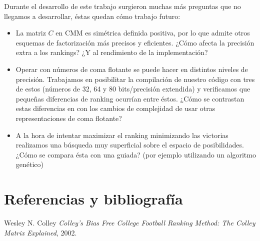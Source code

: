 \documentclass[a4paper]{article}
\begin{document}
Durante el desarrollo de este trabajo surgieron muchas más preguntas que no llegamos a desarrollar, éstas quedan cómo trabajo futuro:
\begin{itemize}
    \item La matriz $C$ en CMM es simétrica definida positiva, por lo que admite otros esquemas de factorización más precisos y eficientes. ¿Cómo afecta la precisión extra a los rankings? ¿Y al rendimiento de la implementación?
    \item Operar con números de coma flotante se puede hacer en distintos niveles de precisión. Trabajamos en posibilitar la compilación de nuestro código con tres de estos (números de 32, 64 y 80 bits/precisión extendida) y verificamos que pequeñas diferencias de ranking ocurrían entre éstos. ¿Cómo se contrastan estas diferencias en con los cambios de complejidad de usar otras representaciones de coma flotante?
    \item A la hora de intentar maximizar el ranking minimizando las victorias realizamos una búsqueda muy superficial sobre el espacio de posibilidades. ¿Cómo se compara ésta con una guiada? (por ejemplo utilizando un algoritmo genético)
\end{itemize}

\section{Referencias y bibliografía}

\begin{thebibliography}{1}
     Wesley N. Colley {\em Colley’s Bias Free College Football Ranking Method: The Colley Matrix Explained}, 2002.
\end{thebibliography}
\end{document}
